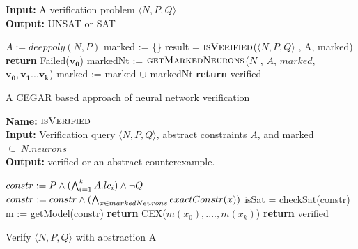 








\begin{algorithm}[t]
  \textbf{Input: } A verification problem $\langle N,P,Q \rangle$ \\
  \textbf{Output: } UNSAT or SAT
  \begin{algorithmic}[1]
    \State $A := deeppoly(N,P)$
    \State marked := \{\}
      \State result = $\textsc{isVerified}$($\langle N,P,Q \rangle$ , A, marked)
          \State \textbf{return} Failed($\boldsymbol{v_0}$)
        \Else
        \State markedNt := $\textsc{getMarkedNeurons}$($N$ , $A$, $marked$, $\boldsymbol{v_0}, \boldsymbol{v_1} ... \boldsymbol{v_k}$)
          \State marked := marked ${\cup}$ markedNt
        \EndIf
      \Else
        \State \textbf{return} verified
      \EndIf
    \EndWhile
  \end{algorithmic}
  \caption{A CEGAR based approach of neural network verification}
  \label{algo:main}
\end{algorithm}

\begin{algorithm}[t]
  \textbf{Name: } $\textsc{isVerified}$ \\
  \textbf{Input: } Verification query $\langle N,P,Q \rangle$, abstract constraints $A$, and marked $\subseteq ~ N.neurons$ \\
  \textbf{Output: } verified or an abstract counterexample. 
  \begin{algorithmic}[1]
    \State $constr := P \land (\bigwedge_{i=1}^k A.lc_i)\land \neg Q$
    \State $constr := constr \land (\bigwedge_{x \in markedNeurons} exactConstr(x))$ 
    \State isSat = checkSat(constr)
      \State m := getModel(constr)
      \State \textbf{return} CEX($m(x_0),....,m(x_k)$)
    \Else
      \State \textbf{return} verified
    \EndIf
  \end{algorithmic}
  \caption{Verify $\langle N,P,Q \rangle$ with abstraction A}
  \label{algo:verif1}
\end{algorithm}

